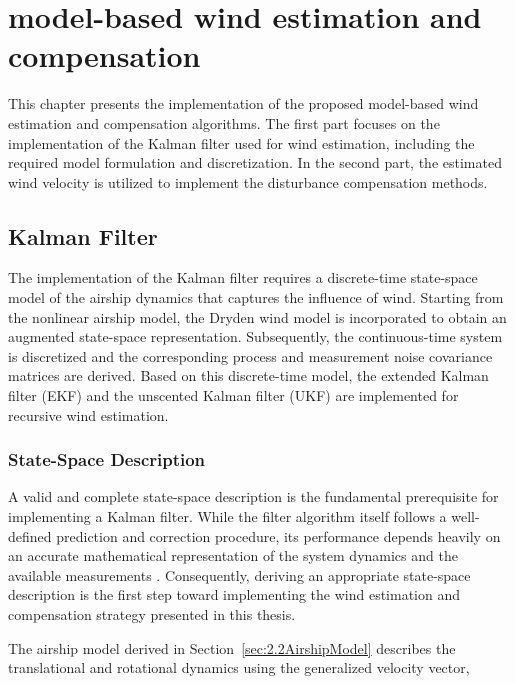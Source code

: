 \chapter{model-based wind estimation and compensation}%
\label{chap:developed-work}

This chapter presents the implementation of the proposed model-based wind estimation and compensation algorithms. The first part focuses on the implementation of the Kalman filter used for wind estimation, including the required model formulation and discretization. In the second part, the estimated wind velocity is utilized to implement the disturbance compensation methods.





\section{Kalman Filter}

The implementation of the Kalman filter requires a discrete-time state-space model of the airship dynamics that captures the influence of wind. Starting from the nonlinear airship model, the Dryden wind model is incorporated to obtain an augmented state-space representation. Subsequently, the continuous-time system is discretized and the corresponding process and measurement noise covariance matrices are derived. Based on this discrete-time model, the extended Kalman filter (EKF) and the unscented Kalman filter (UKF) are implemented for recursive wind estimation.





\subsection{State-Space Description}
\label{sec:3.1.1StateSpace}

A valid and complete state-space description is the fundamental prerequisite for implementing a Kalman filter. While the filter algorithm itself follows a well-defined prediction and correction procedure, its performance depends heavily on an accurate mathematical representation of the system dynamics and the available measurements \cite{Särkka2013KF}. Consequently, deriving an appropriate state-space description is the first step toward implementing the wind estimation and compensation strategy presented in this thesis.

The airship model derived in Section~\ref{sec:2.2AirshipModel} describes the translational and rotational dynamics using the generalized velocity vector,

